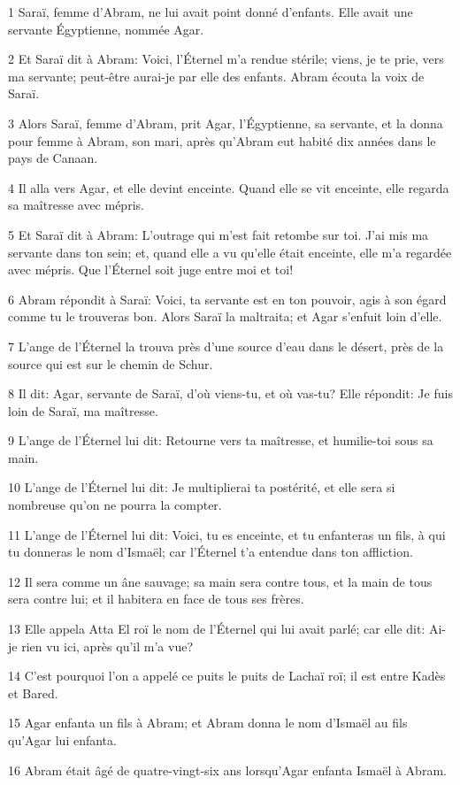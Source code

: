 \par 1 Saraï, femme d'Abram, ne lui avait point donné d'enfants. Elle avait une servante Égyptienne, nommée Agar.
\par 2 Et Saraï dit à Abram: Voici, l'Éternel m'a rendue stérile; viens, je te prie, vers ma servante; peut-être aurai-je par elle des enfants. Abram écouta la voix de Saraï.
\par 3 Alors Saraï, femme d'Abram, prit Agar, l'Égyptienne, sa servante, et la donna pour femme à Abram, son mari, après qu'Abram eut habité dix années dans le pays de Canaan.
\par 4 Il alla vers Agar, et elle devint enceinte. Quand elle se vit enceinte, elle regarda sa maîtresse avec mépris.
\par 5 Et Saraï dit à Abram: L'outrage qui m'est fait retombe sur toi. J'ai mis ma servante dans ton sein; et, quand elle a vu qu'elle était enceinte, elle m'a regardée avec mépris. Que l'Éternel soit juge entre moi et toi!
\par 6 Abram répondit à Saraï: Voici, ta servante est en ton pouvoir, agis à son égard comme tu le trouveras bon. Alors Saraï la maltraita; et Agar s'enfuit loin d'elle.
\par 7 L'ange de l'Éternel la trouva près d'une source d'eau dans le désert, près de la source qui est sur le chemin de Schur.
\par 8 Il dit: Agar, servante de Saraï, d'où viens-tu, et où vas-tu? Elle répondit: Je fuis loin de Saraï, ma maîtresse.
\par 9 L'ange de l'Éternel lui dit: Retourne vers ta maîtresse, et humilie-toi sous sa main.
\par 10 L'ange de l'Éternel lui dit: Je multiplierai ta postérité, et elle sera si nombreuse qu'on ne pourra la compter.
\par 11 L'ange de l'Éternel lui dit: Voici, tu es enceinte, et tu enfanteras un fils, à qui tu donneras le nom d'Ismaël; car l'Éternel t'a entendue dans ton affliction.
\par 12 Il sera comme un âne sauvage; sa main sera contre tous, et la main de tous sera contre lui; et il habitera en face de tous ses frères.
\par 13 Elle appela Atta El roï le nom de l'Éternel qui lui avait parlé; car elle dit: Ai-je rien vu ici, après qu'il m'a vue?
\par 14 C'est pourquoi l'on a appelé ce puits le puits de Lachaï roï; il est entre Kadès et Bared.
\par 15 Agar enfanta un fils à Abram; et Abram donna le nom d'Ismaël au fils qu'Agar lui enfanta.
\par 16 Abram était âgé de quatre-vingt-six ans lorsqu'Agar enfanta Ismaël à Abram.

